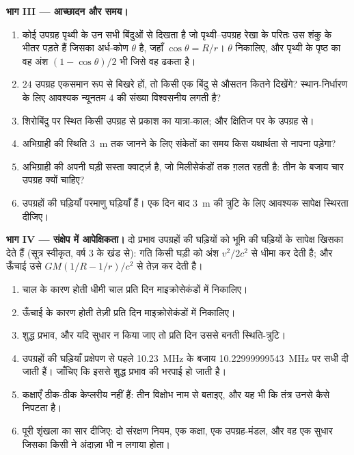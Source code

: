 \begin{problem}
\medskip
\noindent\textbf{भाग III --- आच्छादन और समय।}
\begin{enumerate}[resume]
  \item कोई उपग्रह पृथ्वी के उन सभी बिंदुओं से दिखता है जो पृथ्वी--उपग्रह
        रेखा के परितः उस शंकु के भीतर पड़ते हैं जिसका अर्ध-कोण $\theta$ है,
        जहाँ $\cos\theta = R/r$। $\theta$ निकालिए, और पृथ्वी के पृष्ठ का
        वह अंश $(1 - \cos\theta)/2$ भी जिसे वह ढकता है।
  \item $24$ उपग्रह एकसमान रूप से बिखरे हों, तो किसी एक बिंदु से औसतन
        कितने दिखेंगे? स्थान-निर्धारण के लिए आवश्यक न्यूनतम $4$ की संख्या
        विश्वसनीय लगती है?
  \item शिरोबिंदु पर स्थित किसी उपग्रह से प्रकाश का यात्रा-काल; और क्षितिज
        पर के उपग्रह से।
  \item अभिग्राही की स्थिति \qty{3}{m} तक जानने के लिए संकेतों का समय किस
        यथार्थता से नापना पड़ेगा?
  \item अभिग्राही की अपनी घड़ी सस्ता क्वार्ट्ज़ है, जो मिलीसेकंडों तक
        ग़लत रहती है: तीन के बजाय चार उपग्रह क्यों चाहिए?
  \item उपग्रहों की घड़ियाँ परमाणु घड़ियाँ हैं। एक दिन बाद \qty{3}{m} की
        त्रुटि के लिए आवश्यक सापेक्ष स्थिरता दीजिए।
\end{enumerate}

\medskip
\noindent\textbf{भाग IV --- संक्षेप में आपेक्षिकता।}
दो प्रभाव उपग्रहों की घड़ियों को भूमि की घड़ियों के सापेक्ष खिसका देते हैं
(सूत्र स्वीकृत, वर्ष 3 के खंड से): गति किसी घड़ी को अंश $v^2/2c^2$ से धीमा
कर देती है; और ऊँचाई उसे $GM(1/R - 1/r)/c^2$ से तेज़ कर देती है।
\begin{enumerate}[resume]
  \item चाल के कारण होती धीमी चाल प्रति दिन माइक्रोसेकंडों में निकालिए।
  \item ऊँचाई के कारण होती तेज़ी प्रति दिन माइक्रोसेकंडों में निकालिए।
  \item शुद्ध प्रभाव, और यदि सुधार न किया जाए तो प्रति दिन उससे बनती
        स्थिति-त्रुटि।
  \item उपग्रहों की घड़ियाँ प्रक्षेपण से पहले \qty{10.23}{MHz} के बजाय
        \qty{10.22999999543}{MHz} पर सधी दी जाती हैं। जाँचिए कि इससे शुद्ध
        प्रभाव की भरपाई हो जाती है।
  \item कक्षाएँ ठीक-ठीक केप्लरीय नहीं हैं: तीन विक्षोभ नाम से बताइए, और यह
        भी कि तंत्र उनसे कैसे निपटता है।
  \item पूरी शृंखला का सार दीजिए: दो संरक्षण नियम, एक कक्षा, एक
        उपग्रह-मंडल, और वह एक सुधार जिसका किसी ने अंदाज़ा भी न लगाया होता।
\end{enumerate}
\end{problem}
